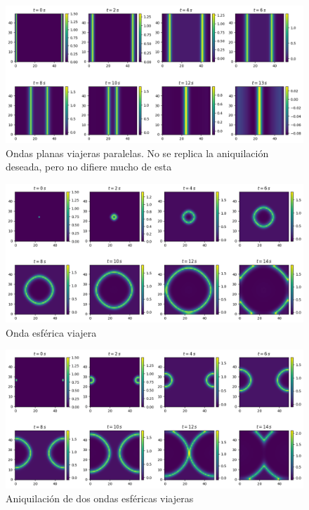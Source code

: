 \documentclass[11pt,letterpaper]{article}
\begin{document}
\begin{multicols*}{2}
\begin{figure}[H]
    \centering
    \includegraphics[scale=0.27]{PlaneWaves.png}
    \caption{Ondas planas viajeras paralelas. No se replica la aniquilación deseada, pero no difiere mucho de esta}
    \label{Fig:PlaneWaves}
\end{figure}

\begin{figure}[H]
    \centering
    \includegraphics[scale=0.27]{SphericalWave.png}
    \caption{Onda esférica viajera}
    \label{Fig:SphericalWave}
\end{figure}

\begin{figure}[H]
    \centering
    \includegraphics[scale=0.27]{SphericalWaves.png}
    \caption{Aniquilación de dos ondas esféricas viajeras}
    \label{Fig:SphericalWaves}
\end{figure}


\end{multicols*}
\end{document}
